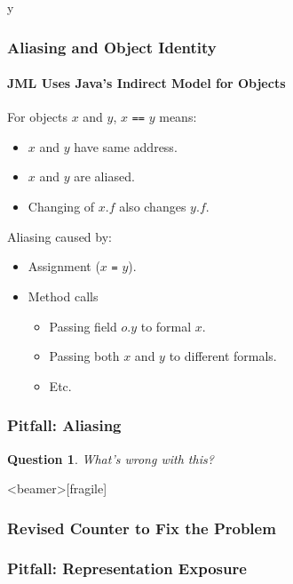 \if y\MAKEHANDOUTS \documentclass[t,compress,landscape,handout]{beamer}
\newtheorem*{question}{Question}
\begin{document}
\begin{frame}
\frametitle{Aliasing and Object Identity}
\framesubtitle{JML Uses Java's Indirect Model for Objects}

For objects $x$ and $y$, $x$ \texttt{==} $y$ means:
\begin{itemize}
\item
$x$ and $y$ have same address.

\item
$x$ and $y$ are aliased.

\item
Changing of $x.f$ also changes $y.f$.
\end{itemize}

Aliasing caused by:
\begin{itemize}
\item
Assignment ($x$ \texttt{=} $y$).

\item
Method calls 
\begin{itemize}
\item
Passing field $o.y$ to formal $x$.

\item
Passing both $x$ and $y$ to different formals.

\item
Etc.
\end{itemize}
\end{itemize}
\end{frame}

\begin{frame}[fragile]
\frametitle{Pitfall: Aliasing}

\begin{question}
What's wrong with this? 

\rm

\end{question}
\end{frame}

\begin{frame}<beamer>[fragile]
\frametitle{Revised Counter to Fix the Problem}


\end{frame}

\begin{frame}[fragile]
\frametitle{Pitfall: Representation Exposure}


\end{frame}
\end{document}

